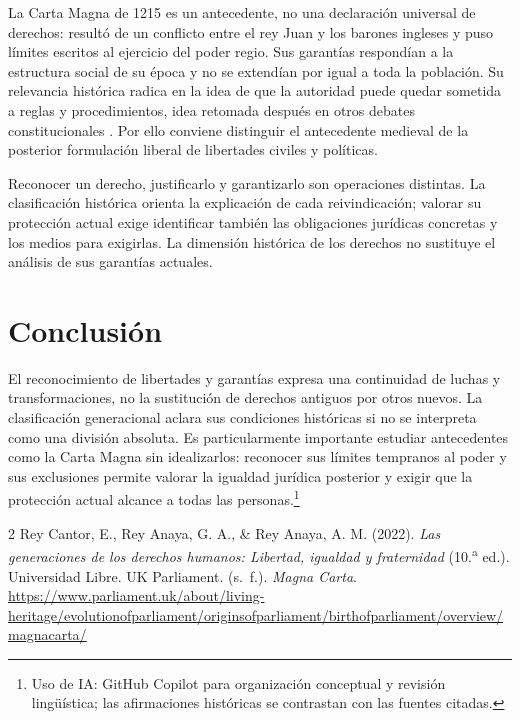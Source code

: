 \documentclass[12pt,spanish,letterpaper,oneside]{article}
\begin{document}
La Carta Magna de 1215 es un antecedente, no una declaración universal de derechos: resultó de un conflicto entre el rey Juan y los barones ingleses y puso límites escritos al ejercicio del poder regio. Sus garantías respondían a la estructura social de su época y no se extendían por igual a toda la población. Su relevancia histórica radica en la idea de que la autoridad puede quedar sometida a reglas y procedimientos, idea retomada después en otros debates constitucionales \citep{parlamentoCarta1215ADH}. Por ello conviene distinguir el antecedente medieval de la posterior formulación liberal de libertades civiles y políticas.

Reconocer un derecho, justificarlo y garantizarlo son operaciones distintas. La clasificación histórica orienta la explicación de cada reivindicación; valorar su protección actual exige identificar también las obligaciones jurídicas concretas y los medios para exigirlas. La dimensión histórica de los derechos no sustituye el análisis de sus garantías actuales.

\section{Conclusión}
El reconocimiento de libertades y garantías expresa una continuidad de luchas y transformaciones, no la sustitución de derechos antiguos por otros nuevos. La clasificación generacional aclara sus condiciones históricas si no se interpreta como una división absoluta. Es particularmente importante estudiar antecedentes como la Carta Magna sin idealizarlos: reconocer sus límites tempranos al poder y sus exclusiones permite valorar la igualdad jurídica posterior y exigir que la protección actual alcance a todas las personas.\footnote{Uso de IA: GitHub Copilot para organización conceptual y revisión lingüística; las afirmaciones históricas se contrastan con las fuentes citadas.}

\clearpage
\begin{thebibliography}{2}
Rey Cantor, E., Rey Anaya, G. A., \& Rey Anaya, A. M. (2022). \emph{Las generaciones de los derechos humanos: Libertad, igualdad y fraternidad} (10.\textsuperscript{a} ed.). Universidad Libre.
UK Parliament. (s.~f.). \emph{Magna Carta}. \url{https://www.parliament.uk/about/living-heritage/evolutionofparliament/originsofparliament/birthofparliament/overview/magnacarta/}
\end{thebibliography}
\end{document}
